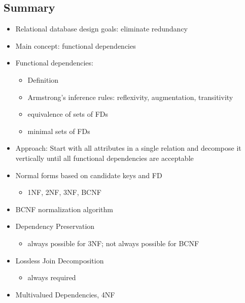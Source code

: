 \subsection{Summary}
\begin{itemize}
    \item Relational database design goals: eliminate redundancy
    \item Main concept: functional dependencies
    \item Functional dependencies:
    \begin{itemize}
        \item Definition
        \item Armstrong's inference rules: reflexivity, augmentation, transitivity
        \item equivalence of sets of FDs
        \item minimal sets of FDs
    \end{itemize}
    \item Approach: Start with all attributes in a single relation and decompose it vertically until all functional dependencies are acceptable
    \item Normal forms based on candidate keys and FD
    \begin{itemize}
        \item 1NF, 2NF, 3NF, BCNF
    \end{itemize}
    \item BCNF normalization algorithm 
    \item Dependency Preservation
    \begin{itemize}
        \item always possible for 3NF; not always possible for BCNF
    \end{itemize}
    \item Lossless Join Decomposition
    \begin{itemize}
        \item always required
    \end{itemize}
    \item Multivalued Dependencies, 4NF
\end{itemize}